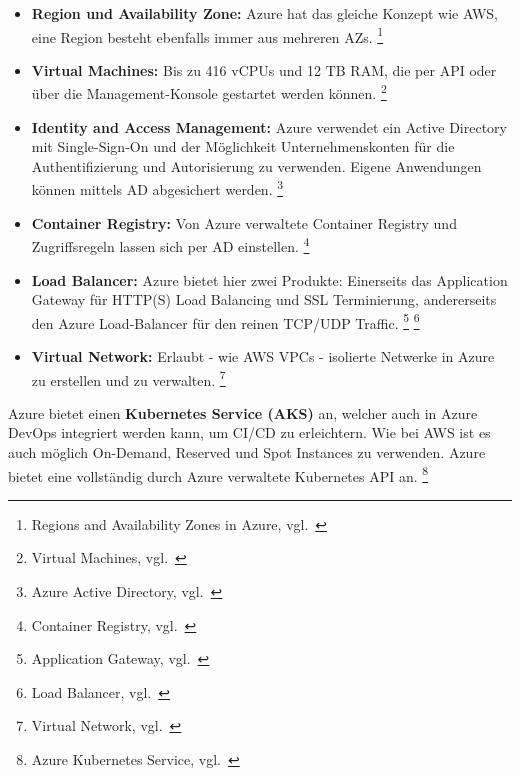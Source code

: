 \begin{itemize}
    \item \textbf{Region und Availability Zone:}
    Azure hat das gleiche Konzept wie AWS, eine Region besteht ebenfalls immer aus mehreren AZs.
    \footnote{{Regions and Availability Zones in Azure, vgl.~\cite{AZURE_REGIONS_AND_AZS}}}

    \item \textbf{Virtual Machines:}
    Bis zu 416 vCPUs und 12 TB RAM, die per API oder über die Management-Konsole gestartet werden können.
    \footnote{{Virtual Machines, vgl.~\cite{AZURE_VIRTUAL_MACHINES}}}

    \item \textbf{Identity and Access Management:}
    Azure verwendet ein Active Directory mit Single-Sign-On und der Möglichkeit Unternehmenskonten für die Authentifizierung und Autorisierung zu verwenden.
    Eigene Anwendungen können mittels AD abgesichert werden.
    \footnote{{Azure Active Directory, vgl.~\cite{AZURE_AD}}}

    \item \textbf{Container Registry:}
    Von Azure verwaltete Container Registry und Zugriffsregeln lassen sich per AD einstellen.
    \footnote{{Container Registry, vgl.~\cite{AZURE_CONTAINER_REGISTRY}}}

    \item \textbf{Load Balancer:}
    Azure bietet hier zwei Produkte: Einerseits das Application Gateway für HTTP(S) Load Balancing und SSL Terminierung,
    andererseits den Azure Load-Balancer für den reinen TCP/UDP Traffic.
    \footnote{{Application Gateway, vgl.~\cite{AZURE_APPLICATION_GATEWAY}}}
    \footnote{{Load Balancer, vgl.~\cite{AZURE_LOAD_BALANCER}}}

    \item \textbf{Virtual Network:}
    Erlaubt - wie AWS VPCs - isolierte Netwerke in Azure zu erstellen und zu verwalten.
    \footnote{{Virtual Network, vgl.~\cite{AZURE_VIRTUAL_NETWORK}}}

\end{itemize}


Azure bietet einen \textbf{Kubernetes Service (AKS)} an,
welcher auch in Azure DevOps integriert werden kann, um CI/CD zu erleichtern.
Wie bei AWS ist es auch möglich On-Demand, Reserved und Spot Instances zu verwenden.
Azure bietet eine vollständig durch Azure verwaltete Kubernetes API an.
\footnote{{Azure Kubernetes Service, vgl.~\cite{AZURE_KUBERNETES}}}